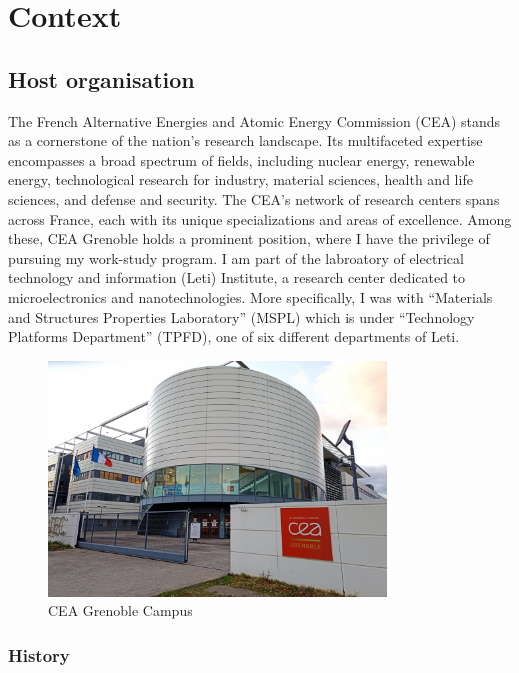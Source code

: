\section{Context}
\subsection{Host organisation}

\medskip

The French Alternative Energies and Atomic Energy Commission (CEA) stands as a cornerstone
of the nation's research landscape. Its multifaceted expertise encompasses a broad spectrum
of fields, including nuclear energy, renewable energy, technological research for industry, material sciences, health and life sciences, and defense and security. The CEA's network
of research centers spans across France, each with its unique specializations and areas
of excellence. Among these, CEA Grenoble holds a prominent position, where I have the 
privilege of pursuing my work-study program. I am part of the labroatory of electrical technology and information (Leti) Institute,
a research center dedicated to microelectronics and nanotechnologies. More specifically, 
I was with “Materials and Structures Properties Laboratory” (MSPL) which is under “Technology Platforms 
Department” (TPFD), one of six different departments of Leti.


\begin{figure}[h!]
    \centering
    \includegraphics[width=0.8\textwidth]{images/ceaphoto.jpg}
    \caption{CEA Grenoble Campus}
\end{figure}

\FloatBarrier

\subsubsection{History}

